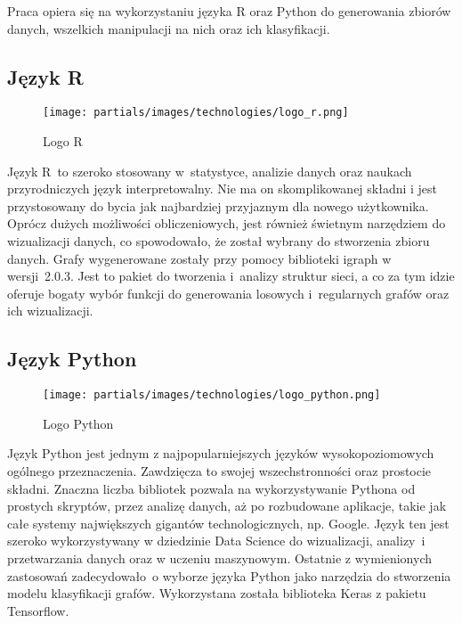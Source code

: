 Praca opiera się na wykorzystaniu języka R oraz Python do generowania zbiorów danych,
wszelkich manipulacji na nich oraz ich klasyfikacji.

\subsection{Język R}

\begin{figure}[ht]
	\centering
	\texttt{[image: partials/images/technologies/logo\_r.png]}
	\caption{Logo R \cite{strR}}
	\label{Fig:tech-r}
\end{figure}
\FloatBarrier

Język R~to szeroko stosowany w~statystyce, analizie danych oraz naukach przyrodniczych język interpretowalny.
Nie ma on skomplikowanej składni i jest przystosowany do bycia jak najbardziej przyjaznym dla nowego użytkownika.
Oprócz dużych możliwości obliczeniowych, jest również świetnym narzędziem do wizualizacji danych,
co spowodowało, że został wybrany do stworzenia zbioru danych.
Grafy wygenerowane zostały przy pomocy biblioteki igraph w wersji~2.0.3.
Jest to pakiet do tworzenia i~analizy struktur sieci, a co za tym idzie oferuje bogaty wybór funkcji do
generowania losowych i~regularnych grafów oraz ich wizualizacji.

\subsection{Język Python}

\begin{figure}[ht]
	\centering
	\texttt{[image: partials/images/technologies/logo\_python.png]}
	\caption{Logo Python \cite{strPython}}
	\label{Fig:tech-python}
\end{figure}
\FloatBarrier

Język Python jest jednym z najpopularniejszych języków wysokopoziomowych ogólnego przeznaczenia.
Zawdzięcza to swojej wszechstronności oraz prostocie składni.
Znaczna liczba bibliotek pozwala na wykorzystywanie Pythona od
prostych skryptów, przez analizę danych, aż po rozbudowane aplikacje, takie jak całe
systemy największych gigantów technologicznych, np. Google. Język ten jest szeroko
wykorzystywany w dziedzinie Data Science do wizualizacji, analizy~i przetwarzania danych oraz w uczeniu maszynowym.
Ostatnie z wymienionych zastosowań zadecydowało~o wyborze języka Python jako narzędzia do stworzenia modelu klasyfikacji grafów.
Wykorzystana została biblioteka Keras z pakietu Tensorflow.

